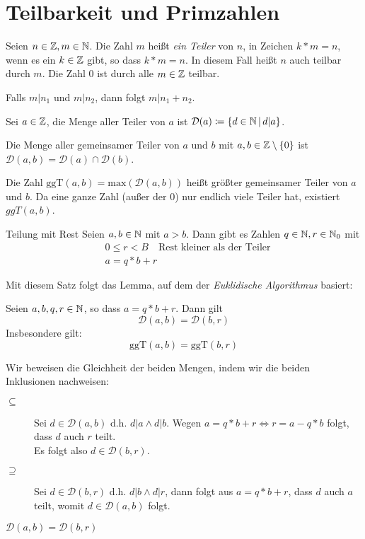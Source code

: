 \section{Teilbarkeit und Primzahlen}
Seien $n\in\mathbb{Z}, m\in\mathbb{N}$. Die Zahl $m$ heißt \emph{ein Teiler} von $n$, in Zeichen $k* m=n$, wenn es ein $k\in\mathbb{Z}$ gibt, so dass $k* m = n$. In diesem Fall heißt $n$ auch teilbar durch $m$.
Die Zahl $0$ ist durch alle $m\in\mathbb{Z}$ teilbar.

Falls $m|n_1$ und $m|n_2$, dann folgt $m|n_1+n_2$.

Sei $a\in\mathbb{Z}$, die Menge aller Teiler von $a$ ist $\mathcal{D}(a)\coloneqq\left\{ d\in\mathbb{N} \,\middle|\, d|a \right\}$.

Die Menge aller gemeinsamer Teiler von $a$ und $b$ mit $a,b\in\mathbb{Z}\setminus\{ 0\}$ ist $\mathcal{D}(a,b) = \mathcal{D}(a) \cap \mathcal{D}(b)$.

Die Zahl $\mathrm{ggT}(a,b) = \mathrm{max}(\mathcal{D}(a,b))$ heißt größter gemeinsamer Teiler von $a$ und $b$. Da eine ganze Zahl (außer der $0$) nur endlich viele Teiler hat, existiert $ggT(a,b)$.

\begin{satz}{Teilung mit Rest}
  Seien $a,b\in\mathbb{N}$ mit $a>b$. Dann gibt es Zahlen $q\in\mathbb{N}, r\in\mathbb{N}_0$ mit
  \begin{align*}
    &0\leq r<B \quad\text{Rest kleiner als der Teiler}\\
    &a=q*b+r
  \end{align*}
\end{satz}
Mit diesem Satz folgt das Lemma, auf dem der \emph{Euklidische Algorithmus} basiert:
\begin{lemma}{}
  Seien $a,b,q,r\in\mathbb{N}$, so dass $a=q*b+r$. Dann gilt
  \begin{equation*}
    \mathcal{D}(a,b)=\mathcal{D}(b,r)
  \end{equation*}
  Insbesondere gilt:
  \begin{equation*}
    \mathrm{ggT}(a,b)=\mathrm{ggT}(b,r)
  \end{equation*}
\end{lemma}
\beweis
Wir beweisen die Gleichheit der beiden Mengen, indem wir die beiden Inklusionen nachweisen:

\begin{description}
  \item[\glqq$\subseteq$\grqq]
  Sei $d\in\mathcal{D}(a,b)$ d.h. $d|a \wedge d|b$. Wegen $a=q*b+r \Leftrightarrow r=a-q*b$ folgt, dass $d$ auch $r$ teilt.\\
  Es folgt also $d\in \mathcal{D}(b,r)$.
  \item[\glqq$\supseteq$\grqq]
  Sei $d\in\mathcal{D}(b,r)$ d.h. $d|b\wedge d|r$, dann folgt aus $a=q*b+r$, dass $d$ auch $a$ teilt, womit $d\in \mathcal{D}(a,b)$ folgt.
\end{description}
$\mathcal{D}(a,b)=\mathcal{D}(b,r)$

